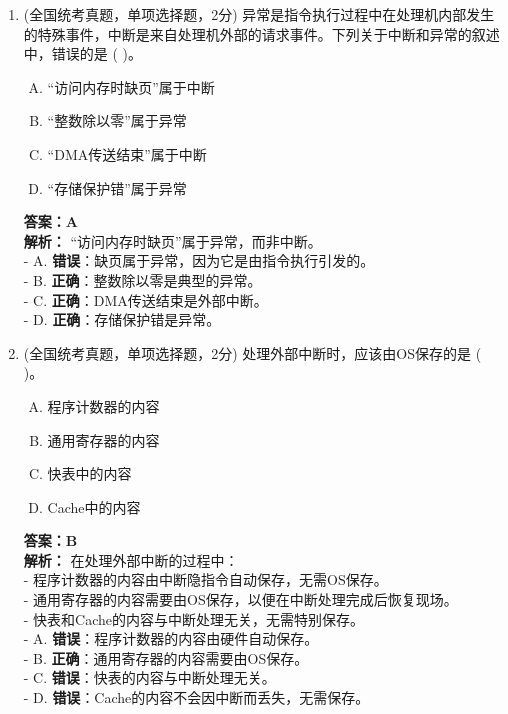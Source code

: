 \documentclass[lang=cn,newtx,10pt,scheme=chinese]{../../elegantbook}
\begin{document}
\begin{enumerate}
\item (全国统考真题，单项选择题，2分) 异常是指令执行过程中在处理机内部发生的特殊事件，中断是来自处理机外部的请求事件。下列关于中断和异常的叙述中，错误的是 (    )。
    \begin{enumerate}[A.]
        \item “访问内存时缺页”属于中断
        \item “整数除以零”属于异常
        \item “DMA传送结束”属于中断
        \item “存储保护错”属于异常
    \end{enumerate}
    \textbf{答案：A}\\
    \textbf{解析：} “访问内存时缺页”属于异常，而非中断。\\
    - A. \textbf{错误}：缺页属于异常，因为它是由指令执行引发的。\\
    - B. \textbf{正确}：整数除以零是典型的异常。\\
    - C. \textbf{正确}：DMA传送结束是外部中断。\\
    - D. \textbf{正确}：存储保护错是异常。\\

    \item (全国统考真题，单项选择题，2分) 处理外部中断时，应该由OS保存的是 (    )。
    \begin{enumerate}[A.]
        \item 程序计数器的内容
        \item 通用寄存器的内容
        \item 快表中的内容
        \item Cache中的内容
    \end{enumerate}
    \textbf{答案：B}\\
    \textbf{解析：} 在处理外部中断的过程中：\\
    - 程序计数器的内容由中断隐指令自动保存，无需OS保存。\\
    - 通用寄存器的内容需要由OS保存，以便在中断处理完成后恢复现场。\\
    - 快表和Cache的内容与中断处理无关，无需特别保存。\\
    - A. \textbf{错误}：程序计数器的内容由硬件自动保存。\\
    - B. \textbf{正确}：通用寄存器的内容需要由OS保存。\\
    - C. \textbf{错误}：快表的内容与中断处理无关。\\
    - D. \textbf{错误}：Cache的内容不会因中断而丢失，无需保存。\\


\end{enumerate}
\end{document}
